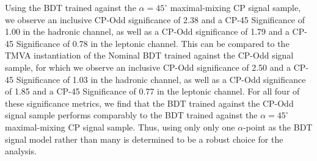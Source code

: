 Using the BDT trained against the $\alpha = 45^{\circ}$ maximal-mixing CP signal sample, we observe an inclusive CP-Odd significance of 2.38 and a CP-45 Significance of 1.00 in the hadronic channel, as well as a CP-Odd significance of 1.79 and a CP-45 Significance of 0.78 in the leptonic channel.
This can be compared to the TMVA instantiation of the Nominal BDT trained against the CP-Odd signal sample, for which we observe an inclusive CP-Odd significance of 2.50 and a CP-45 Significance of 1.03 in the hadronic channel, as well as a CP-Odd significance of 1.85 and a CP-45 Significance of 0.77 in the leptonic channel.
For all four of these significance metrics, we find that the BDT trained against the CP-Odd signal sample performs comparably to the BDT trained against the $\alpha = 45^{\circ}$ maximal-mixing CP signal sample. Thus, using only only one $\alpha$-point as the BDT signal model rather than many is determined to be a robust choice for the analysis.
